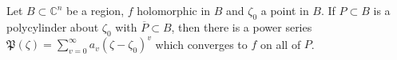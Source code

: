 Let $B \subset \mathbb{C}^n$ be a region, $f$ holomorphic in $B$ and $\zeta_0$ a point in $B$. If $P \subset B$ is a polycylinder about $\zeta_0$ with $\overline{P} \subset B$, then there is a power series $\mathfrak{P}(\zeta) = \sum_{v=0}^{\infty} a_v(\zeta - \zeta_0)^v$ which converges to $f$ on all of $P$.
